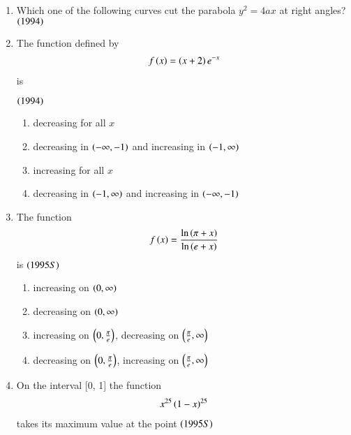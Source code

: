 \documentclass[journal,12pt,twocolumn]{IEEEtran}
\theoremstyle{remark}
\begin{document}
\begin{enumerate}
\begin{enumerate}
\end{enumerate}

\item Which one of the following curves cut the parabola
$y^2 = 4ax$ at right angles?
\hfill$\left(1994\right)$
\begin{enumerate}
\end{enumerate}

\item The function defined by 
\begin{align*}
	f\left(x\right) = \left(x+2\right)e^{-x}
\end{align*} is

\hfill$\left(1994\right)$
\begin{enumerate}
	\item decreasing for all $x$
	\item decreasing in $\left(-\infty, -1\right)$ and increasing
		in $\left(-1, \infty\right)$
        \item increasing for all $x$
	\item decreasing in $\left(-1, \infty\right)$ and increasing
		in $\left(-\infty, -1\right)$
\end{enumerate}

\item The function 
\begin{align*}
		f\left(x\right) =\frac{\ln \left(\pi + x\right)}{\ln \left(e + x\right)}
\end{align*} is
\hfill$\left(1995S\right)$

\begin{enumerate}
	\item increasing on $\left(0, \infty\right)$
	\item decreasing on $\left(0, \infty\right)$
	\item increasing on $\left(0, \frac{\pi}{e}\right)$,
		decreasing on $\left(\frac{\pi}{e}, \infty\right)$
	\item decreasing on $\left(0, \frac{\pi}{e}\right)$,
		increasing on $\left(\frac{\pi}{e}, \infty\right)$
\end{enumerate}

\item On the interval [0, 1] the 
function
\begin{align*}
x^{25}\left(1-x\right)^{25}
\end{align*} 
takes its maximum value at the point 
\hfill$\left(1995S\right)$
\end{enumerate}
\end{document}
